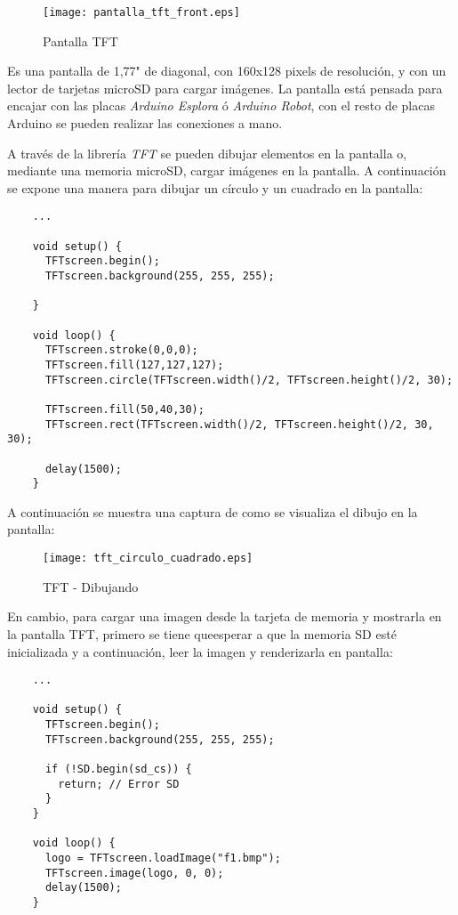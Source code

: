 \begin{figure}[H]
    \centering
    \texttt{[image: pantalla\_tft\_front.eps]}
    \caption{Pantalla TFT}\label{fig:arduino-tft-front}
\end{figure}



Es una pantalla de 1,77" de diagonal, con 160x128 pixels de resolución, y con un lector de tarjetas microSD para cargar imágenes. La pantalla está pensada para encajar con las placas \emph{Arduino Esplora} ó \emph{Arduino Robot}, con el resto de placas Arduino se pueden realizar las conexiones a mano.

A través de la librería \emph{TFT} se pueden dibujar elementos en la pantalla o, mediante una memoria microSD, cargar imágenes en la pantalla. A continuación se expone una manera para dibujar un círculo y un cuadrado en la pantalla:

\begin{lstlisting}
    ...

    void setup() {
      TFTscreen.begin();
      TFTscreen.background(255, 255, 255);

    }

    void loop() {
      TFTscreen.stroke(0,0,0);
      TFTscreen.fill(127,127,127);
      TFTscreen.circle(TFTscreen.width()/2, TFTscreen.height()/2, 30);

      TFTscreen.fill(50,40,30);
      TFTscreen.rect(TFTscreen.width()/2, TFTscreen.height()/2, 30, 30);

      delay(1500);
    }
\end{lstlisting}

A continuación se muestra una captura de como se visualiza el dibujo en la pantalla:

\begin{figure}[H]
    \centering
    \texttt{[image: tft\_circulo\_cuadrado.eps]}
    \caption{TFT - Dibujando}\label{fig:tft_circulo_cuadrado}
\end{figure}

En cambio, para cargar una imagen desde la tarjeta de memoria y mostrarla en la pantalla TFT, primero se tiene queesperar a que la memoria SD esté inicializada y a continuación, leer la imagen y renderizarla en pantalla:

\begin{lstlisting}
    ...

    void setup() {
      TFTscreen.begin();
      TFTscreen.background(255, 255, 255);

      if (!SD.begin(sd_cs)) {
        return; // Error SD
      }
    }

    void loop() {
      logo = TFTscreen.loadImage("f1.bmp");
      TFTscreen.image(logo, 0, 0);
      delay(1500);
    }
\end{lstlisting}

